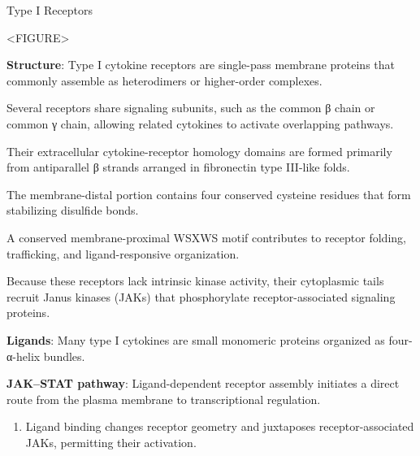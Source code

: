     \begin{core}{Type I Receptors}

      <FIGURE>

      \textbf{Structure}: Type I cytokine receptors are single-pass membrane proteins that commonly assemble as heterodimers or higher-order complexes.

      Several receptors share signaling subunits, such as the common β chain or common γ chain, allowing related cytokines to activate overlapping pathways.

      Their extracellular cytokine-receptor homology domains are formed primarily from antiparallel β strands arranged in fibronectin type III-like folds.

      The membrane-distal portion contains four conserved cysteine residues that form stabilizing disulfide bonds.

      A conserved membrane-proximal WSXWS motif contributes to receptor folding, trafficking, and ligand-responsive organization.

      Because these receptors lack intrinsic kinase activity, their cytoplasmic tails recruit Janus kinases (JAKs) that phosphorylate receptor-associated signaling proteins.

      \textbf{Ligands}: Many type I cytokines are small monomeric proteins organized as four-α-helix bundles.

      \textbf{JAK--STAT pathway}: Ligand-dependent receptor assembly initiates a direct route from the plasma membrane to transcriptional regulation.

      \begin{enumerate}[label=(\arabic*)]

        \item Ligand binding changes receptor geometry and juxtaposes receptor-associated JAKs, permitting their activation.


\end{enumerate}
\end{core}

